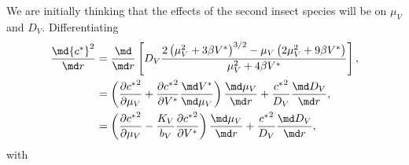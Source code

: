\documentclass{jpmarticle}
\begin{document}
We are initially thinking that the effects of the second insect
species will be on $\mu_V$ and $D_V$.  Differentiating
\begin{equation}
  \begin{split}
    \frac{\md {c^*}^2}{\md r}
    &=
    \frac{\md}{\md r} \left[
      D_V
      \frac{2 \left(\mu_V^2 + 3 \beta V^*\right)^{3/2}
        - \mu_V \left(2 \mu_V^2 + 9 \beta V^*\right)}
      {\mu_V^2 + 4 \beta V^*}
    \right],
    \\
    &=
    \left(
      \frac{\partial {c^*}^2}{\partial \mu_V}
      +
      \frac{\partial {c^*}^2}{\partial V^*} \frac{\md V^*}{\md \mu_V}
    \right)
    \frac{\md \mu_V}{\md r}
    +
    \frac{{c^*}^2}{D_V} \frac{\md D_V}{\md r},
    \\
    &=
    \left(
      \frac{\partial {c^*}^2}{\partial \mu_V}
      -
      \frac{K_V}{b_V}
      \frac{\partial {c^*}^2}{\partial V^*}
    \right)
    \frac{\md \mu_V}{\md r}
    +
    \frac{{c^*}^2}{D_V} \frac{\md D_V}{\md r},
  \end{split}
\end{equation}
with
\end{document}
